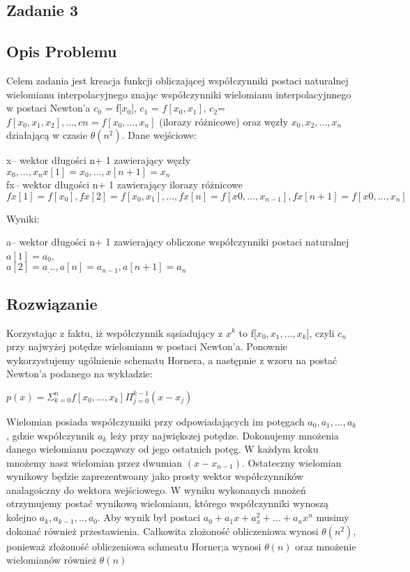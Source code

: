 \documentclass[11pt]{article}
\begin{document}
\begin{flushleft}
\section{Zadanie 3}
\subsection{Opis Problemu}
Celem zadania jest kreacja funkcji obliczającej współczynniki postaci naturalnej wielomianu interpolacyjnego znając współczynniki wielomianu interpolacyjnnego w postaci Newton'a $c_0$ = f[$x_0$], $c_1$ = $f[x_0,x_1]$, $c_2$= $f[x_0, x_1, x_2],. . .,cn=f[x_0, . . . , x_n]$ (ilorazy różnicowe) oraz węzły $ x_0, x_2, . . . , x_n $ działającą w czasie $\theta(n^2)$. Dane wejściowe:\\
\begin{center}
x– wektor długości n+ 1 zawierający węzły $x_0, . . . , x_n x[1]=x_0,...,x[n+1]=x_n$ \\
fx– wektor długości n+ 1 zawierający ilorazy różnicowe $fx[1]=f[x_0],fx[2]=f[x_0, x_1],...,fx[n]=f[x0, . . . , x_{n−1}],fx[n+1]=f[x0, . . . , x_n]$\\
\begin{flushleft}
Wyniki:\\
\end{flushleft}
a– wektor długości n+ 1 zawierający obliczone współczynniki postaci naturalnej\\
$a[1]=a_0$,\\
$a[2]=a_...,a[n]=a_{n−1},a[n+1]=a_n$
\end{center}
\subsection{Rozwiązanie}
Korzystając z faktu, iż współczynnik sąsiadujący z $x^k$ to f[$x_0,x_1,...,x_k$], czyli $c_n$ przy najwyżej potędze wielomianu w postaci Newton'a. Ponownie wykorzystujemy ugólnienie schematu Hornera, a następnie z wzoru na postać Newton'a podanego na  wykładzie: \\
\begin{center}
$p(x) = \Sigma^n_{k=0} f[x_0,...,x_k] \Pi^{k-1}_{j=0}(x-x_j)$\\
\end{center}
Wielomian posiada współczynniki przy odpowiadających im potęgach $a_0,a_1,...,a_k$, gdzie współczynnik $a_k$ leży przy największej potędze. Dokonujemy mnożenia danego wielomianu począwszy od jego ostatnich potęg. W każdym kroku mnożemy nasz  wielomian przez dwumian $(x-x_{n-1})$. Ostateczny wielomian wynikowy będzie zaprezentwoany jako prosty wektor współczynników analagoiczny do wektora wejściowego. W wyniku wykonanych mnożeń otrzymujemy postać wynikową wielomianu, którego współczynniki wynoszą kolejno $a_k,a_{k-1},..,a_0$. Aby wynik był postaci $a_0+a_1x+a_x^2+...+a_nx^n$ musimy dokonać również przestawienia. Całkowita złożoność obliczeniowa wynosi $\theta(n^2)$, ponieważ złożoność obliczeniowa schmeatu Horner;a wynosi $\theta(n)$ oraz mnożenie wielomianów również $\theta(n)$


\end{flushleft}
\end{document}
